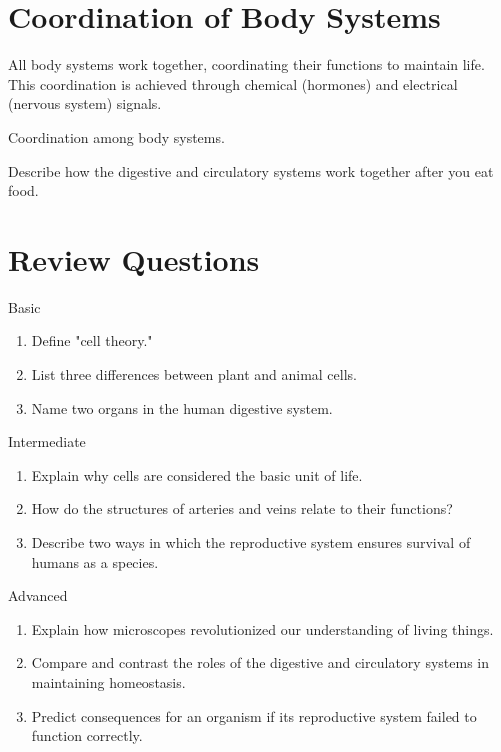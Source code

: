 \section{Coordination of Body Systems}

All body systems work together, coordinating their functions to maintain life. This coordination is achieved through chemical (hormones) and electrical (nervous system) signals.

\begin{marginfigure}
\caption{Coordination among body systems.}
\end{marginfigure}

\begin{stopandthink}
Describe how the digestive and circulatory systems work together after you eat food.
\end{stopandthink}

\section{Review Questions}

\begin{tieredquestions}{Basic}
\begin{enumerate}
    \item Define "cell theory."
    \item List three differences between plant and animal cells.
    \item Name two organs in the human digestive system.
\end{enumerate}
\end{tieredquestions}

\begin{tieredquestions}{Intermediate}
\begin{enumerate}
    \item Explain why cells are considered the basic unit of life.
    \item How do the structures of arteries and veins relate to their functions?
    \item Describe two ways in which the reproductive system ensures survival of humans as a species.
\end{enumerate}
\end{tieredquestions}

\begin{tieredquestions}{Advanced}
\begin{enumerate}
    \item Explain how microscopes revolutionized our understanding of living things.
    \item Compare and contrast the roles of the digestive and circulatory systems in maintaining homeostasis.
    \item Predict consequences for an organism if its reproductive system failed to function correctly.
\end{enumerate}
\end{tieredquestions}

